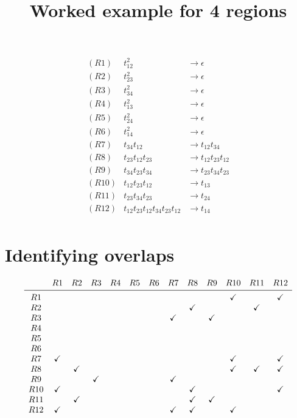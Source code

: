 \documentclass{article}
\title{Worked example for 4 regions}
\begin{document}
\[\begin{array}{lll}
(R1) & t_{12}^2 &\rightarrow \epsilon \\
(R2) & t_{23}^2 &\rightarrow \epsilon \\
(R3) & t_{34}^2 &\rightarrow \epsilon \\
(R4) & t_{13}^2 &\rightarrow \epsilon \\
(R5) & t_{24}^2 &\rightarrow \epsilon \\
(R6) & t_{14}^2 &\rightarrow \epsilon \\
(R7) & t_{34} t_{12} &\rightarrow t_{12} t_{34} \\
(R8) & t_{23} t_{12} t_{23} &\rightarrow t_{12} t_{23} t_{12} \\
(R9) & t_{34} t_{23} t_{34} &\rightarrow t_{23} t_{34} t_{23} \\
(R10) & t_{12} t_{23} t_{12} &\rightarrow t_{13} \\
(R11) & t_{23} t_{34} t_{23} &\rightarrow t_{24} \\
(R12) & t_{12} t_{23} t_{12} t_{34} t_{23} t_{12} &\rightarrow t_{14} \\

\end{array}\]

\section{Identifying overlaps}
\[
\begin{array}{ *{13}{c} }
   & R1 & R2 & R3 & R4 & R5 & R6 & R7 & R8 & R9 & R10 & R11 & R12 \\
\midrule
R1 &  &  &  &  &  &  &  &  &  & \checkmark  &  & \checkmark  \\
R2 &  &  &  &  &  &  &  & \checkmark  &  &  & \checkmark  &  \\
R3 &  &  &  &  &  &  & \checkmark  &  & \checkmark  &  &  &  \\
R4 &  &  &  &  &  &  &  &  &  &  &  &  \\

R5 &  &  &  &  &  &  &  &  &  &  &  &  \\
R6 &  &  &  &  &  &  &  &  &  &  &  &  \\
R7 & \checkmark &  &  &  &  &  &  &  &  & \checkmark &  & \checkmark \\
R8 &  & \checkmark &  &  &  &  &  &  &  & \checkmark & \checkmark & \checkmark \\

R9 &  &  & \checkmark &  &  &  & \checkmark &  &  &  &  &  \\
R10 & \checkmark &  &  &  &  &  &  & \checkmark &  &  & & \checkmark \\
R11 &  & \checkmark &  &  &  &  &  & \checkmark & \checkmark &  &  &  \\
R12  & \checkmark & &  &  &  &  & \checkmark & \checkmark &  & \checkmark &  &  \\
\end{array}
\]
\end{document}
